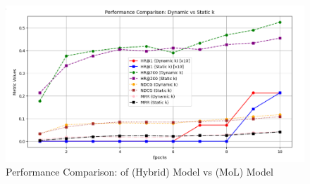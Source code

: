 \documentclass{article}
\begin{document}
	\begin{figure}[ht]
	\centering
	\includegraphics[width=1.3\textwidth]{comparision.PNG}  
	\caption{Performance Comparison: of (Hybrid) Model vs (MoL) Model }
	\label{fig:image1}
\end{figure}





	
\end{document}
